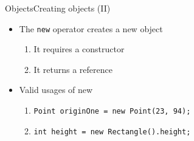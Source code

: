 \documentclass[10pt,compress]{beamer} %
\begin{document}
\begin{frame}[shrink]{Objects}{Creating objects (II)}
	\begin{itemize}
	\item The \texttt{new} operator creates a new object
		\begin{enumerate}
		\item It requires a constructor
		\item It returns a reference
		\end{enumerate}
	\item Valid usages of new
		\begin{enumerate}
		\item \texttt{Point originOne = new Point(23, 94);}
		\item \texttt{int height = new Rectangle().height;}
		\end{enumerate}
	\end{itemize}

\end{frame}

%		

\end{document}

